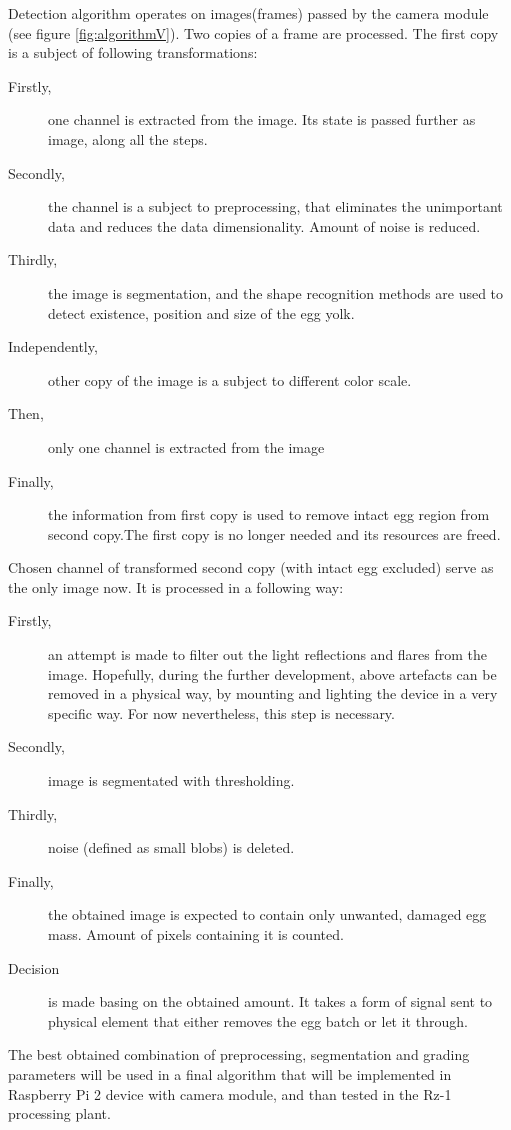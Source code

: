 \documentclass[12pt,twoside,a4paper]{article}
\begin{document}
Detection algorithm operates on images(frames) passed by the camera module (see figure \ref{fig:algorithmV}).
Two copies of a frame are processed. The first copy is a subject of following transformations:
\begin{description}
  \item[Firstly,]one channel is extracted from the image.
  Its state is passed further as image, along all the steps.
  \item[Secondly,]the channel is a subject to preprocessing, that eliminates the unimportant data and reduces the data dimensionality. 
  Amount of noise is reduced.
  \item[Thirdly,]the image is segmentation, and the shape recognition methods are used to detect existence, position and size of the egg yolk.
  \item[Independently,]other copy of the image is a subject to different color scale.
  \item[Then,]only one channel is extracted from the image
  \item[Finally,]the information from first copy is used to remove intact egg region from second copy.The first copy is no longer needed and its resources are freed.
\end{description}

Chosen channel of transformed second copy (with intact egg excluded) serve as the only image now.
It is processed in a following way:

\begin{description}
  \item[Firstly,]an attempt is made to filter out the light reflections and flares from the image.
  Hopefully, during the further development, above artefacts can be removed in a physical way, by mounting and lighting the device in a very specific way.
  For now nevertheless, this step is necessary.
  \item[Secondly,]image is segmentated with thresholding.
  \item[Thirdly,]noise (defined as small blobs) is deleted.
  \item[Finally,]the obtained image is expected to contain only unwanted, damaged egg mass.
  Amount of pixels containing it is counted.
  \item[Decision] is made basing on the obtained amount.
  It takes a form of signal sent to physical element that either removes the egg batch or let it through.
\end{description}

The best obtained combination of preprocessing, segmentation and grading parameters will be used in a final algorithm that will be implemented in Raspberry Pi 2 device with camera module, and than tested in the Rz-1 processing plant.
\end{document}
